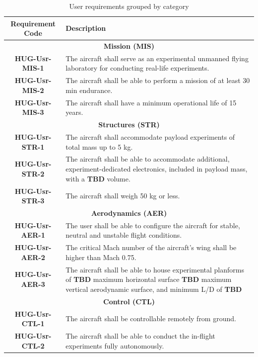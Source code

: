 \begin{table}[H]
    \centering
    \caption{User requirements grouped by category}
    \begin{tabular}{|c|p{13cm}|}
        \hline 
        \textbf{Requirement Code} & \textbf{Description} \\
        \hline \hline
        \multicolumn{2}{|c|}{\textbf{Mission (MIS)}} \\
        \hline
        \textbf{HUG-Usr-MIS-1} & The aircraft shall serve as an experimental unmanned flying laboratory for conducting real-life experiments.\\
        \hline
        \textbf{HUG-Usr-MIS-2} & The aircraft shall be able to perform a mission of at least 30 min endurance.\\
        \hline
        \textbf{HUG-Usr-MIS-3} & The aircraft shall have a minimum operational life of 15 years.\\
        \hline

        \multicolumn{2}{|c|}{\textbf{Structures (STR)}} \\
        \hline
        \textbf{HUG-Usr-STR-1} & The aircraft shall accommodate payload experiments of total mass up to 5 kg.\\
        \hline
        \textbf{HUG-Usr-STR-2} & The aircraft shall be able to accommodate additional, experiment-dedicated electronics, included in payload mass, with a \textbf{TBD} volume.\\
        \hline
        \textbf{HUG-Usr-STR-3} & The aircraft shall weigh 50 kg or less.\\
        \hline

        \multicolumn{2}{|c|}{\textbf{Aerodynamics (AER)}} \\
        \hline
        \textbf{HUG-Usr-AER-1} & The user shall be able to configure the aircraft for stable, neutral and unstable flight conditions. \\ 
        \hline
        \textbf{HUG-Usr-AER-2} & The critical Mach number of the aircraft's wing shall be higher than Mach 0.75.\\ \hline
        \textbf{HUG-Usr-AER-3} & The aircraft shall be able to house experimental planforms of \textbf{TBD} maximum horizontal surface \textbf{TBD} maximum vertical aerodynamic surface, and minimum L/D of \textbf{TBD}\\
        \hline

        \multicolumn{2}{|c|}{\textbf{Control (CTL)}} \\
        \hline
        \textbf{HUG-Usr-CTL-1} & The aircraft shall be controllable remotely from ground.\\ \hline
        \textbf{HUG-Usr-CTL-2} & The aircraft shall be able to conduct the in-flight experiments fully autonomously.\\
        \hline


\end{tabular}
\end{table}
